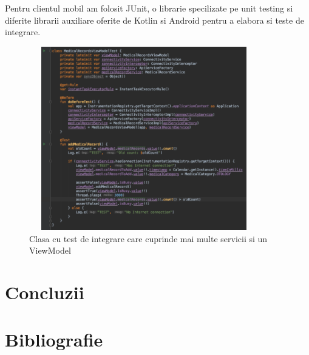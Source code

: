\documentclass[12pt]{article}
\begin{document}
Pentru clientul mobil am folosit JUnit, o librarie specilizate pe unit testing si
diferite librarii auxiliare oferite de Kotlin si Android pentru a elabora si teste de integrare.

\begin{figure}[H]
    \centering
    \includegraphics[width=10cm, height=8cm]{interg.png}
    \caption{Clasa cu test de integrare care cuprinde mai multe servicii si un ViewModel}
    \end{figure}



\section{Concluzii}
\newpage
\section{Bibliografie}
\nocite{owasp-top10-2017}
\nocite{owasp-top10-mobile}
\nocite{3ways-auth}

\nocite{liu2016follow}
\nocite{ssidloc}
\nocite{googleperm}
\nocite{redditcalc}

\nocite{rfc-7519}
\nocite{jwt}
\nocite{enisa-2017}
\nocite{enisa-security-data-processing}
\nocite{goldberg1998comparison}
\nocite{felt2017measuring}
\nocite{fette2011websocket}
\nocite{erkkila2012websocket}
\nocite{test-ws}

\nocite{katz1996handbook}
\nocite{tutrsa}
\nocite{jonsson2003public}

\nocite{kahn2010mobile}
\nocite{barton2012regulation}

\nocite{mvvmpng}

\nocite{masse2011rest}
\nocite{tilkov2010node}
\nocite{reqpersec}

\nocite{banker2011mongodb}
\nocite{nayak2013type}


\nocite{jetpackpng}
\nocite{statcounter}
\nocite{moskala2017android}
\nocite{kotlinvsjava}

\printbibliography[title=Bibliografie]
\end{document}
